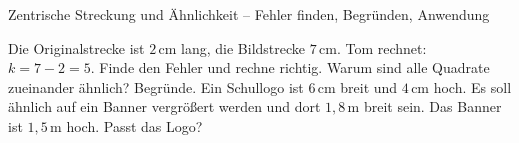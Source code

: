 \begin{aufgabe}{Zentrische Streckung und Ähnlichkeit – Fehler finden, Begründen, Anwendung}
\begin{teile}
\teil Die Originalstrecke ist $2\,\text{cm}$ lang, die Bildstrecke $7\,\text{cm}$. Tom rechnet: $k = 7 - 2 = 5$. Finde den Fehler und rechne richtig.
\teil Warum sind alle Quadrate zueinander ähnlich? Begründe.
\teil Ein Schullogo ist $6\,\text{cm}$ breit und $4\,\text{cm}$ hoch. Es soll ähnlich auf ein Banner vergrößert werden und dort $1{,}8\,\text{m}$ breit sein. Das Banner ist $1{,}5\,\text{m}$ hoch. Passt das Logo?
\end{teile}
\end{aufgabe}
